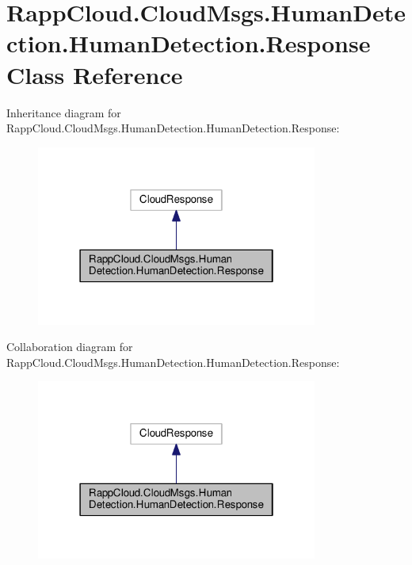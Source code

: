 \hypertarget{classRappCloud_1_1CloudMsgs_1_1HumanDetection_1_1HumanDetection_1_1Response}{\section{Rapp\-Cloud.\-Cloud\-Msgs.\-Human\-Detection.\-Human\-Detection.\-Response Class Reference}
\label{classRappCloud_1_1CloudMsgs_1_1HumanDetection_1_1HumanDetection_1_1Response}
}


Inheritance diagram for Rapp\-Cloud.\-Cloud\-Msgs.\-Human\-Detection.\-Human\-Detection.\-Response\-:
\nopagebreak
\begin{figure}[H]
\begin{center}
\leavevmode
\includegraphics[width=262pt]{classRappCloud_1_1CloudMsgs_1_1HumanDetection_1_1HumanDetection_1_1Response__inherit__graph}
\end{center}
\end{figure}


Collaboration diagram for Rapp\-Cloud.\-Cloud\-Msgs.\-Human\-Detection.\-Human\-Detection.\-Response\-:
\nopagebreak
\begin{figure}[H]
\begin{center}
\leavevmode
\includegraphics[width=262pt]{classRappCloud_1_1CloudMsgs_1_1HumanDetection_1_1HumanDetection_1_1Response__coll__graph}
\end{center}
\end{figure}
